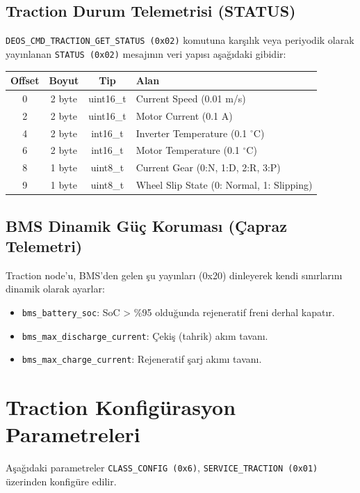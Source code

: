 \documentclass[a4paper,10pt]{article}
\newcommand{\code}[1]{\texttt{#1}}
\begin{document}
\subsection{Traction Durum Telemetrisi (STATUS)}

\code{DEOS\_CMD\_TRACTION\_GET\_STATUS (0x02)} komutuna karşılık veya periyodik olarak yayınlanan \code{STATUS (0x02)} mesajının veri yapısı aşağıdaki gibidir:

\begin{center}
\begin{tabular}{c c c l}
\toprule
\textbf{Offset} & \textbf{Boyut} & \textbf{Tip} & \textbf{Alan} \\
\midrule
0 & 2 byte & uint16\_t & Current Speed (0.01 m/s) \\
2 & 2 byte & uint16\_t & Motor Current (0.1 A) \\
4 & 2 byte & int16\_t  & Inverter Temperature (0.1 $^\circ$C) \\
6 & 2 byte & int16\_t  & Motor Temperature (0.1 $^\circ$C) \\
8 & 1 byte & uint8\_t  & Current Gear (0:N, 1:D, 2:R, 3:P) \\
9 & 1 byte & uint8\_t  & Wheel Slip State (0: Normal, 1: Slipping) \\
\bottomrule
\end{tabular}
\end{center}

\subsection{BMS Dinamik Güç Koruması (Çapraz Telemetri)}
Traction node'u, BMS'den gelen şu yayınları (0x20) dinleyerek kendi sınırlarını dinamik olarak ayarlar:
\begin{itemize}
    \item \code{bms\_battery\_soc}: SoC > \%95 olduğunda rejeneratif freni derhal kapatır.
    \item \code{bms\_max\_discharge\_current}: Çekiş (tahrik) akım tavanı.
    \item \code{bms\_max\_charge\_current}: Rejeneratif şarj akımı tavanı.
\end{itemize}

\section{Traction Konfigürasyon Parametreleri}

Aşağıdaki parametreler \code{CLASS\_CONFIG (0x6)}, \code{SERVICE\_TRACTION (0x01)} üzerinden konfigüre edilir.
\end{document}
